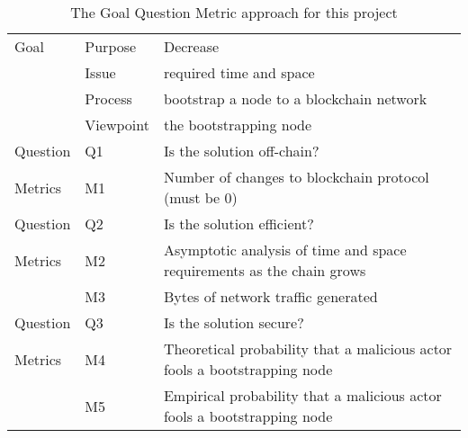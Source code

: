 \begin{table}[h]
    \centering
    \begin{tabular}{|ll|l|}
        \hline
        Goal & Purpose    & Decrease \\
             & Issue      & required time and space \\
             & Process    & bootstrap a node to a blockchain network \\
             & Viewpoint  & the bootstrapping node \\ \hline

        Question & Q1 & Is the solution off-chain? \\ \hline
        Metrics  & M1 & Number of changes to blockchain protocol (must be 0) \\ \hline

        Question & Q2 & Is the solution efficient? \\ \hline
        Metrics  & M2 & Asymptotic analysis of time and space requirements as the chain grows \\
                 & M3 & Bytes of network traffic generated \\ \hline

        Question & Q3 & Is the solution secure? \\ \hline
        Metrics  & M4 & Theoretical probability that a malicious actor fools a bootstrapping node \\
                 & M5 & Empirical probability that a malicious actor fools a bootstrapping node \\
        \hline
    \end{tabular}
    \caption{The Goal Question Metric approach for this project}
    \label{tab:gqm}
\end{table}
